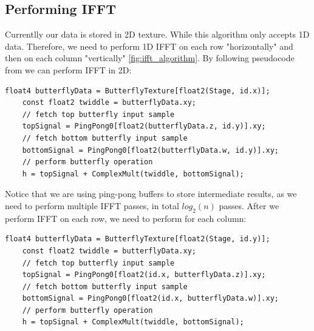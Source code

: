 \subsection{Performing IFFT}
Currentlly our data is stored in 2D texture. While this algorithm only accepts 1D data. Therefore, we need to perform 1D IFFT on each row "horizontally" and then on each column "vertically" \ref{fig:ifft_algorithm}.
By following pseudocode from \cite{flugge2017} we can perform IFFT in 2D:

\begin{lstlisting}[caption={Horizontal Butterfly Operation}, frame=single, numberstyle=\small\color{gray}, captionpos=b]
    float4 butterflyData = ButterflyTexture[float2(Stage, id.x)];
    const float2 twiddle = butterflyData.xy;
    // fetch top butterfly input sample
    topSignal = PingPong0[float2(butterflyData.z, id.y)].xy;
    // fetch bottom butterfly input sample
    bottomSignal = PingPong0[float2(butterflyData.w, id.y)].xy;
    // perform butterfly operation
    h = topSignal + ComplexMult(twiddle, bottomSignal);
\end{lstlisting}

Notice that we are using ping-pong buffers to store intermediate results, as we need to perform multiple IFFT passes, in total $log_2(n)$ passes.
After we perform IFFT on each row, we need to perform for each column:
\begin{lstlisting}[caption={Vertical Butterfly Operation}, frame=single, numberstyle=\small\color{gray}, captionpos=b]
    float4 butterflyData = ButterflyTexture[float2(Stage, id.y)];
    const float2 twiddle = butterflyData.xy;
    // fetch top butterfly input sample
    topSignal = PingPong0[float2(id.x, butterflyData.z)].xy;
    // fetch bottom butterfly input sample
    bottomSignal = PingPong0[float2(id.x, butterflyData.w)].xy;
    // perform butterfly operation
    h = topSignal + ComplexMult(twiddle, bottomSignal);
\end{lstlisting}


